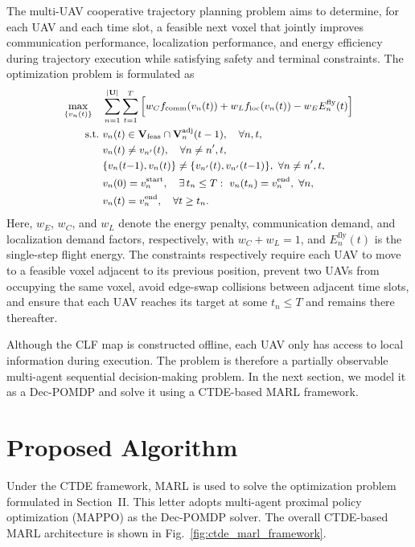 \documentclass[lettersize,journal]{IEEEtran}
\begin{document}
The multi-UAV cooperative trajectory planning problem aims to determine, for each UAV and each time slot, a feasible next voxel that jointly improves communication performance, localization performance, and energy efficiency during trajectory execution while satisfying safety and terminal constraints. The optimization problem is formulated as
\begin{equation}
\small
\begin{aligned}
\max_{\{v_n(t)\}}\quad
& \sum_{n=1}^{|\mathbf{U}|}\sum_{t=1}^{T}
\Big[
w_C f_{\mathrm{comm}}(v_n(t))
+ w_L f_{\mathrm{loc}}(v_n(t))
- w_E E_n^{\mathrm{fly}}(t)
\Big] \\
\mathrm{s.t.}\
& v_n(t)\in
\mathbf{V}_{\mathrm{feas}}\cap
\mathbf{V}_n^{\mathrm{adj}}(t-1),
\quad \forall n,t,\\
& v_n(t)\neq v_{n'}(t),
\quad \forall n\neq n',t,\\
& \{v_n(t{-}1),v_n(t)\}\neq\{v_{n'}(t),v_{n'}(t{-}1)\},\ \forall n\neq n',t,\\
& v_n(0)=v_n^{\mathrm{start}},\quad
\exists\,t_n\le T:\ v_n(t_n)=v_n^{\mathrm{end}},\ \forall n,\\
& v_n(t)=v_n^{\mathrm{end}},\quad \forall t\ge t_n .
\end{aligned}
\end{equation}
Here, $w_E$, $w_C$, and $w_L$ denote the energy penalty, communication demand, and localization demand factors, respectively, with $w_C+w_L=1$, and $E_n^{\mathrm{fly}}(t)$ is the single-step flight energy. The constraints respectively require each UAV to move to a feasible voxel adjacent to its previous position, prevent two UAVs from occupying the same voxel, avoid edge-swap collisions between adjacent time slots, and ensure that each UAV reaches its target at some $t_n\le T$ and remains there thereafter.

Although the CLF map is constructed offline, each UAV only has access to local information during execution. The problem is therefore a partially observable multi-agent sequential decision-making problem. In the next section, we model it as a Dec-POMDP and solve it using a CTDE-based MARL framework.

\section{Proposed Algorithm}

Under the CTDE framework, MARL is used to solve the optimization problem formulated in Section~II. This letter adopts multi-agent proximal policy optimization (MAPPO) as the Dec-POMDP solver. The overall CTDE-based MARL architecture is shown in Fig.~\ref{fig:ctde_marl_framework}.
\end{document}
